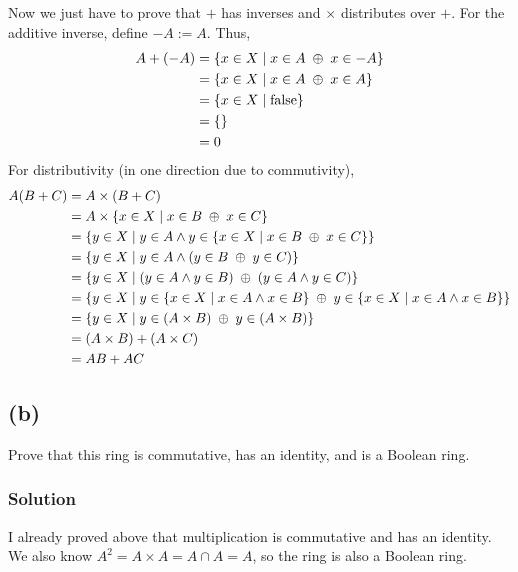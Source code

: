 \documentclass[fleqn]{article}
\newcommand*\xor{\thickspace \oplus \thickspace}
\begin{document}
            Now we just have to prove that $+$ has inverses and $\times$ distributes over $+$.  For the additive inverse, define $-A := A$.  Thus,
            \begin{align}
                A + (-A) &= \{x \in X \mid x \in A \xor x \in -A\} \\
                    &= \{x \in X \mid x \in A \xor x \in A\} \\
                    &= \{x \in X \mid \text{false}\} \\
                    &= \{\} \\
                    &= 0
            \end{align}
            For distributivity (in one direction due to commutivity),
            \begin{align}
                A(B + C) &= A \times (B + C) \\
                    &= A \times \{x \in X \mid x \in B \xor x \in C\} \\
                    &= \{y \in X \mid y \in A \land y \in \{x \in X \mid x \in B \xor x \in C\}\} \\
                    &= \{y \in X \mid y \in A \land (y \in B \xor y \in C)\} \\
                    &= \{y \in X \mid (y \in A \land y \in B) \xor (y \in A \land y \in C)\} \\
                    &= \{y \in X \mid y \in \{x \in X \mid x \in A \land x \in B\} \xor y \in \{x \in X \mid x \in A \land x \in B\}\} \\
                    &= \{y \in X \mid y \in (A \times B) \xor y \in (A \times B)\} \\
                    &= (A \times B) + (A \times C) \\
                    &= AB + AC
            \end{align}
        
        \subsection{(b)}
        Prove that this ring is commutative, has an identity, and is a Boolean ring.
        
            \subsubsection{Solution}
            I already proved above that multiplication is commutative and has an identity.  \\
            We also know $A^2 = A \times A = A \cap A = A$, so the ring is also a Boolean ring.
    
\end{document}
